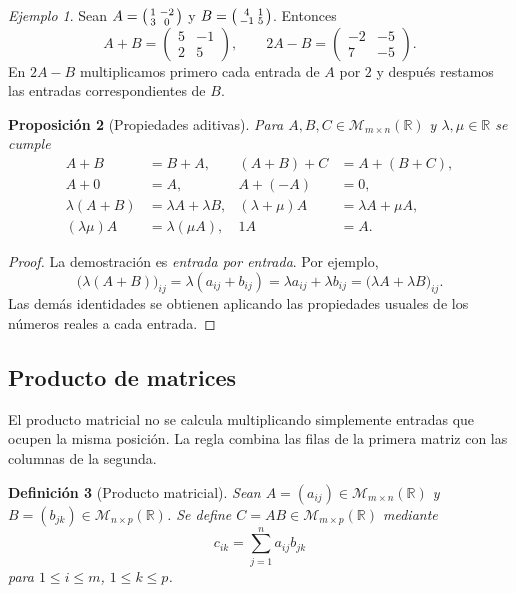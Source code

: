\documentclass[12pt]{article}
\newtheorem{definicion}{Definición}[section]
\newtheorem{proposicion}[definicion]{Proposición}
\theoremstyle{remark}
\newtheorem{ejemplo}[definicion]{Ejemplo}
\newcommand{\R}{\mathbb{R}}
\newcommand{\Mat}[2]{\mathcal{M}_{#1\times #2}}
\begin{document}
\begin{ejemplo}
Sean $A=\begin{psmallmatrix}1&-2\\3&0\end{psmallmatrix}$ y $B=\begin{psmallmatrix}4&1\\-1&5\end{psmallmatrix}$. Entonces
\[
A+B=\begin{pmatrix}5&-1\\2&5\end{pmatrix},\qquad
2A-B=\begin{pmatrix}-2&-5\\7&-5\end{pmatrix}.
\]
En $2A-B$ multiplicamos primero cada entrada de $A$ por $2$ y después restamos las entradas correspondientes de $B$.
\end{ejemplo}

\begin{proposicion}[Propiedades aditivas]
Para $A,B,C\in\Mat{m}{n}(\R)$ y $\lambda,\mu\in\R$ se cumple
\begin{align*}
A+B&=B+A,& (A+B)+C&=A+(B+C),\\
A+0&=A,& A+(-A)&=0,\\
\lambda(A+B)&=\lambda A+\lambda B,& (\lambda+\mu)A&=\lambda A+\mu A,\\
(\lambda\mu)A&=\lambda(\mu A),&1A&=A.
\end{align*}
\end{proposicion}
\begin{proof}
La demostración es \emph{entrada por entrada}. Por ejemplo,
\[
\bigl(\lambda(A+B)\bigr)_{ij}=\lambda(a_{ij}+b_{ij})
=\lambda a_{ij}+\lambda b_{ij}
=\bigl(\lambda A+\lambda B\bigr)_{ij}.
\]
Las demás identidades se obtienen aplicando las propiedades usuales de los números reales a cada entrada.
\end{proof}

\subsection{Producto de matrices}
El producto matricial no se calcula multiplicando simplemente entradas que ocupen la misma posición. La regla combina las filas de la primera matriz con las columnas de la segunda.

\begin{definicion}[Producto matricial]
Sean $A=(a_{ij})\in\Mat{m}{n}(\R)$ y $B=(b_{jk})\in\Mat{n}{p}(\R)$. Se define $C=AB\in\Mat{m}{p}(\R)$ mediante
\[
\boxed{\quad c_{ik}=\sum_{j=1}^{n}a_{ij}b_{jk}\quad}
\]
para $1\le i\le m$, $1\le k\le p$.
\end{definicion}
\end{document}
